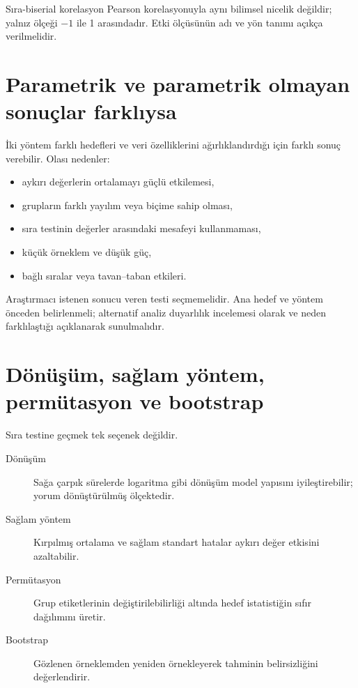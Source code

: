 Sıra-biserial korelasyon Pearson korelasyonuyla aynı bilimsel nicelik değildir;
yalnız ölçeği $-1$ ile 1 arasındadır. Etki ölçüsünün adı ve yön tanımı açıkça
verilmelidir.

\section{Parametrik ve parametrik olmayan sonuçlar farklıysa}

İki yöntem farklı hedefleri ve veri özelliklerini ağırlıklandırdığı için
farklı sonuç verebilir. Olası nedenler:

\begin{itemize}
  \item aykırı değerlerin ortalamayı güçlü etkilemesi,
  \item grupların farklı yayılım veya biçime sahip olması,
  \item sıra testinin değerler arasındaki mesafeyi kullanmaması,
  \item küçük örneklem ve düşük güç,
  \item bağlı sıralar veya tavan--taban etkileri.
\end{itemize}

Araştırmacı istenen sonucu veren testi seçmemelidir. Ana hedef ve yöntem
önceden belirlenmeli; alternatif analiz duyarlılık incelemesi olarak ve neden
farklılaştığı açıklanarak sunulmalıdır.

\section{Dönüşüm, sağlam yöntem, permütasyon ve bootstrap}

Sıra testine geçmek tek seçenek değildir.

\begin{description}
  \item[Dönüşüm] Sağa çarpık sürelerde logaritma gibi dönüşüm model yapısını iyileştirebilir; yorum dönüştürülmüş ölçektedir.
  \item[Sağlam yöntem] Kırpılmış ortalama ve sağlam standart hatalar aykırı değer etkisini azaltabilir.
  \item[Permütasyon] Grup etiketlerinin değiştirilebilirliği altında hedef istatistiğin sıfır dağılımını üretir.
  \item[Bootstrap] Gözlenen örneklemden yeniden örnekleyerek tahminin belirsizliğini değerlendirir.
\end{description}

